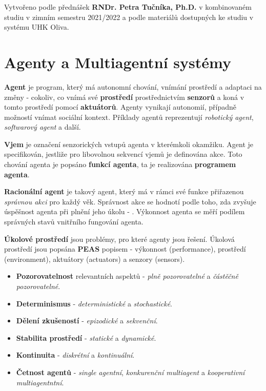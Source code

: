 \epigraph{Vytvořeno podle přednášek \textbf{RNDr. Petra Tučníka, Ph.D.} v kombinovaném studiu v zimním semestru 2021/2022 a podle materiálů dostupných ke studiu v systému UHK Oliva.}{}

\section{Agenty a Multiagentní systémy}

\textbf{Agent} je program, který má autonomní chování, vnímání prostředí a adaptaci na změny - cokoliv, co vnímá své \textbf{prostředí} prostřednictvím \textbf{senzorů} a koná v tomto prostředí pomocí \textbf{aktuátorů}. Agenty vynikají autonomií, případně možností vnímat sociální kontext. Příklady agentů reprezentují \textit{robotický agent}, \textit{softwarový agent} a další.

\textbf{Vjem} je označení senzorických vstupů agenta v kterémkoli okamžiku. Agent je specifikován, jestliže pro libovolnou sekvencí vjemů je definována akce. Toto chování agenta je popsáno \textbf{funkcí agenta}, ta je realizována \textbf{programem agenta}.

\textbf{Racionální agent} je takový agent, který má v rámci své funkce přiřazenou \textit{správnou akci} pro každý věk. Správnost akce se hodnotí podle toho, zda zvyšuje úspěšnost agenta při plnění jeho úkolu - . Výkonnost agenta se měří podílem správných stavů vnitřního fungování agenta.

\textbf{Úkolové prostředí} jsou problémy, pro které agenty jsou řešení. Úkolová prostředí jsou popsána \textbf{PEAS} popisem - výkonnost (performance), prostředí (environment), aktuátory (actuators) a senzory (sensors).

\begin{itemize}
\item \textbf{Pozorovatelnost} relevantních aspektů - \textit{plně pozorovatelné} a \textit{částěčně pozorovatelné}.
\item \textbf{Determinismus} - \textit{deterministické} a \textit{stochastické}.
\item \textbf{Dělení zkušeností} - \textit{epizodické} a \textit{sekvenční}.
\item \textbf{Stabilita prostředí} - \textit{statické} a \textit{dynamické}.
\item \textbf{Kontinuita} - \textit{diskrétní} a \textit{kontinuální}.
\item \textbf{Četnost agentů} - \textit{single agentní}, \textit{konkurenční multiagent} a \textit{kooperativní multiagentntní}.
\end{itemize}

